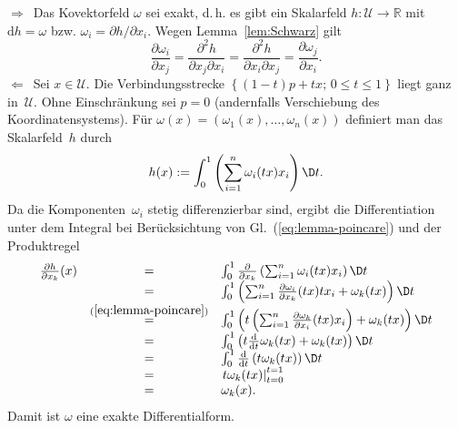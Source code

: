 \begin{svmultproof}
\glqq$\Rightarrow$\grqq\ Das Kovektorfeld $\omega$ sei exakt, d.\,h. es gibt
ein Skalarfeld $h:\mathcal{U}\to{\mathbb{R}}$ mit ${\mathrm{d}} h=\omega$ bzw. $\omega_{i}=\partial h/\partial x_{i}$.
Wegen Lemma~\ref{lem:Schwarz} gilt
\[
\frac{\partial\omega_{i}}{\partial x_{j}}=\frac{\partial^{2}h}{\partial x_{j}\partial x_{i}}=\frac{\partial^{2}h}{\partial x_{i}\partial x_{j}}=\frac{\partial\omega_{j}}{\partial x_{i}}.
\]
\glqq$\Leftarrow$\grqq\ Sei $x\in\mathcal{U}$. Die Verbindungsstrecke $\left\{ (1-t)p+tx;\,0\leq t\leq1\right\} $
liegt ganz in~$\mathcal{U}$. Ohne Einschränkung sei $p=0$ (andernfalls
Verschiebung des Koordinatensystems). Für $\omega(x)=(\omega_{1}(x),\ldots,\omega_{n}(x))$
definiert man das Skalarfeld~$h$ durch
\begin{equation}
h(x):=\int_{0}^{1}\left(\sum_{i=1}^{n}\omega_{i}(tx)x_{i}\right)\D t.\label{eq:potential-poincare}
\end{equation}
 Da die Komponenten~$\omega_{i}$ stetig differenzierbar sind, ergibt
die Differentiation unter dem Integral bei Berücksichtung von Gl.~(\ref{eq:lemma-poincare})
und der Produktregel
\[
\begin{array}{ccl}
\frac{\partial h}{\partial x_{k}}(x) & = & \int_{0}^{1}\frac{\partial}{\partial x_{k}}\left(\sum_{i=1}^{n}\omega_{i}(tx)x_{i}\right)\D t\\
 & = & \int_{0}^{1}\left(\sum_{i=1}^{n}\frac{\partial\omega_{i}}{\partial x_{k}}(tx)tx_{i}+\omega_{k}(tx)\right)\D t\\
 & \stackrel{(\ref{eq:lemma-poincare})}{=} & \int_{0}^{1}\left(t\left(\sum_{i=1}^{n}\frac{\partial\omega_{k}}{\partial x_{i}}(tx)x_{i}\right)+\omega_{k}(tx)\right)\D t\\
 & = & \int_{0}^{1}\left(t\frac{{\mathrm{d}}}{{\mathrm{d}} t}\omega_{k}(tx)+\omega_{k}(tx)\right)\D t\\
 & = & \int_{0}^{1}\frac{{\mathrm{d}}}{{\mathrm{d}} t}\left(t\omega_{k}(tx)\right)\D t\\
 & = & \left.t\omega_{k}(tx)\right|_{t=0}^{t=1}\\
 & = & \omega_{k}(x).
\end{array}
\]
Damit ist $\omega$ eine exakte Differentialform.
\end{svmultproof}

